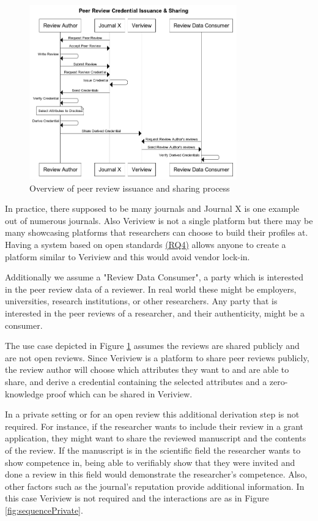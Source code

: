 \begin{figure}[htpb]
  \centering
  \includegraphics[width=0.8\textwidth]{figures/sequence.png}
  \caption{Overview of peer review issuance and sharing process} \label{fig:sequence1}
\end{figure}

In practice, there supposed to be many journals and Journal X is one example out of numerous journals. Also Veriview is not a single platform but there may be many showcasing platforms that researchers can choose to build their profiles at. Having a system based on open standards \hyperref[rq:open-standards]{(RQ4)} allows anyone to create a platform similar to Veriview and this would avoid vendor lock-in. 

Additionally we assume a "Review Data Consumer", a party which is interested in the peer review data of a reviewer. In real world these might be employers, universities, research institutions, or other researchers. Any party that is interested in the peer reviews of a researcher, and their authenticity, might be a consumer. 

The use case depicted in Figure \ref{fig:sequence1} assumes the reviews are shared publicly and are not open reviews. Since Veriview is a platform to share peer reviews publicly, the review author will choose which attributes they want to and are able to share, and derive a credential containing the selected attributes and a zero-knowledge proof which can be shared in Veriview. 

In a private setting or for an open review this additional derivation step is not required. For instance, if the researcher wants to include their review in a grant application, they might want to share the reviewed manuscript and the contents of the review. If the manuscript is in the scientific field the researcher wants to show competence in, being able to verifiably show that they were invited and done a review in this field  would demonstrate the researcher's competence. Also, other factors such as the journal's reputation provide additional information. In this case Veriview is not required and the interactions are as in Figure \ref{fig:sequencePrivate}.

